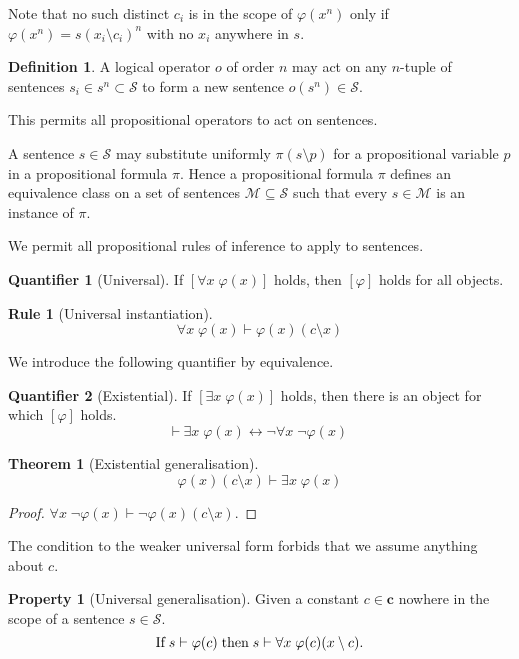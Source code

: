 \documentclass{amsbook}
\newcommand{\infers}{\mathrel\vdash}
\newcommand{\theorem}{\mathord\vdash\medspace}
\newcommand{\univ}[1]{\mathord\forall#1\;}
\newcommand{\exis}[1]{\mathord\exists#1\;}
\newcommand{\eqv}{\mathrel\leftrightarrow}
\theoremstyle{definition}
\newtheorem{prop}{Property}[section]
\newtheorem{frule}{Rule}[chapter]
\newtheorem{quant}{Quantifier}[chapter]
\newtheorem{thm}{Theorem}[section]
\newtheorem{dfn}{Definition}[section]
\begin{document}
Note that no such distinct $c_i$ is in the scope of $\varphi(x^n)$ only if $\varphi(x^n) = s(x_i \setminus c_i)^n$ with no $x_i$ anywhere in $s$.

\begin{dfn}
    A logical operator $o$ of order $n$ may act on any $n$-tuple of sentences $s_i \in s^n \subset \mathcal S$ to form a new sentence $o(s^n) \in \mathcal S$.
\end{dfn}

This permits all propositional operators to act on sentences.

A sentence $s \in \mathcal S$ may substitute uniformly $\pi(s \setminus p)$ for a propositional variable $p$ in a propositional formula $\pi$. Hence a propositional formula $\pi$ defines an equivalence class on a set of sentences $\mathcal M \subseteq \mathcal S$ such that every $s \in \mathcal M$ is an instance of $\pi$.

We permit all propositional rules of inference to apply to sentences.

\begin{quant}[Universal]
    If $\left[\univ x \varphi(x)\right]$ holds, then $[\varphi]$ holds for all objects.
\end{quant}

\begin{frule}[Universal instantiation]
    $$\univ x \varphi(x) \infers \varphi(x)(c \setminus x)$$
\end{frule}

We introduce the following quantifier by equivalence.

\begin{quant}[Existential]
    If $\left[\exis x \varphi(x)\right]$ holds, then there is an object for which $[\varphi]$ holds.
    $$\theorem \exis x \varphi(x) \eqv \neg\univ x \neg\varphi(x)$$
\end{quant}

\begin{thm}[Existential generalisation]
    $$\varphi(x)(c \setminus x) \infers \exis x \varphi(x)$$
    \begin{proof}
        $\univ x \neg\varphi(x) \infers \neg\varphi(x)(c \setminus x)$.
    \end{proof}
\end{thm}

The condition to the weaker universal form forbids that we assume anything about $c$.

\begin{prop}[Universal generalisation]
    Given a constant $c \in \mathbf c$ nowhere in the scope of a sentence $s \in \mathcal S$.
    $$\text{If\;} s \infers \varphi(c) \text{\;then\;} s \infers \univ x \varphi(c)(x \setminus c)\text.$$
\end{prop}
\end{document}
